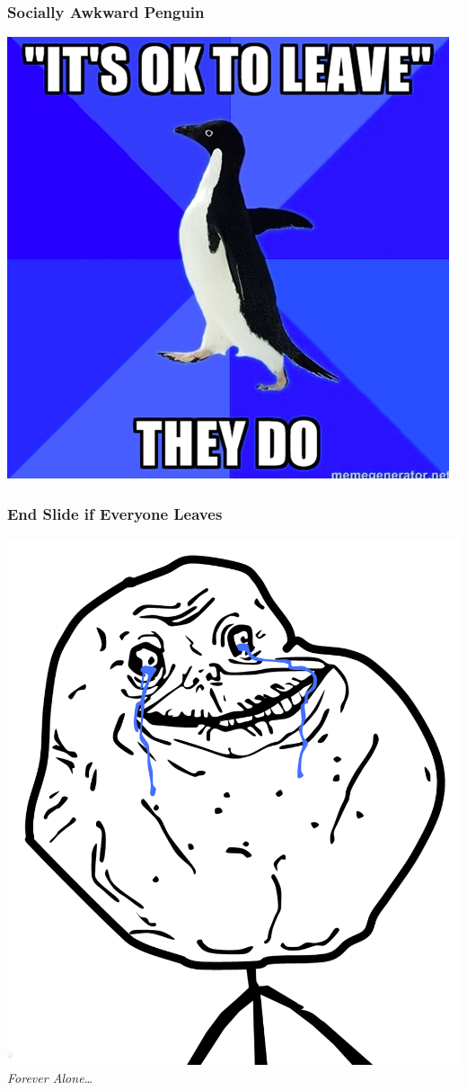 \documentclass[slidestop,compress,mathserif]{beamer}
\begin{document}
\begin{frame}
	\frametitle{Socially Awkward Penguin}
	\begin{center}
		\includegraphics[scale=0.3]{img/sap.png}
	\end{center}
\end{frame}

\begin{frame}
	\frametitle{End Slide if Everyone Leaves}
	\begin{center}
		\includegraphics[scale=0.15]{img/forever_alone.png}
		\vskip 0.5cm
		\emph{Forever Alone{\ldots}}
	\end{center}
\end{frame}
\end{document}
